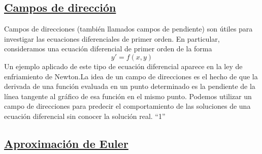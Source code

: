 \documentclass[12 pt,letterpaper]{article}
\newcommand{\bibTitle}[1]{``#1''}
\begin{document}
	
	\flushleft\subsection{\underline{Campos de dirección}}\vspace{0.5cm}
	
	
	\begin{enumerate}
	\justify
    Campos de direcciones (también llamados campos de pendiente) son útiles para investigar las ecuaciones diferenciales de primer orden. En particular, consideramos una ecuación diferencial de primer orden de la forma\[y'=f(x,y)\]Un ejemplo aplicado de este tipo de ecuación diferencial aparece en la ley de enfriamiento de Newton.La idea de un campo de direcciones es el hecho de que la derivada de una función evaluada en un punto determinado es la pendiente de la línea tangente al gráfico de esa función en el mismo punto. Podemos utilizar un campo de direcciones para predecir el comportamiento de las soluciones de una ecuación diferencial sin conocer la solución real. \bibTitle{1}
		
	\end{enumerate} 
	
	
	\flushleft\subsection{\underline{Aproximación de Euler}}\vspace{0.5cm}
	
\end{document}

